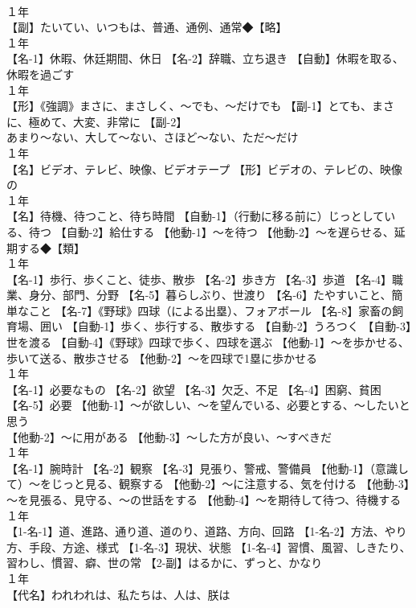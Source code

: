 \documentclass[8pt]{extreport}
\begin{document}
\begin{CJK}{UTF8}{min}
\\	１年	
\\	【副】たいてい、いつもは、普通、通例、通常◆【略】
\\	１年	
\\	【名-1】休暇、休廷期間、休日 【名-2】辞職、立ち退き 【自動】休暇を取る、休暇を過ごす
\\	１年	
\\	【形】《強調》まさに、まさしく、～でも、～だけでも 【副-1】とても、まさに、極めて、大変、非常に 【副-2】
\\	あまり～ない、大して～ない、さほど～ない、ただ～だけ
\\	１年	
\\	【名】ビデオ、テレビ、映像、ビデオテープ 【形】ビデオの、テレビの、映像の
\\	１年	
\\	【名】待機、待つこと、待ち時間 【自動-1】（行動に移る前に）じっとしている、待つ 【自動-2】給仕する 【他動-1】～を待つ 【他動-2】～を遅らせる、延期する◆【類】
\\	１年	
\\	【名-1】歩行、歩くこと、徒歩、散歩 【名-2】歩き方 【名-3】歩道 【名-4】職業、身分、部門、分野 【名-5】暮らしぶり、世渡り 【名-6】たやすいこと、簡単なこと 【名-7】《野球》四球（による出塁）、フォアボール 【名-8】家畜の飼育場、囲い 【自動-1】歩く、歩行する、散歩する 【自動-2】うろつく 【自動-3】世を渡る 【自動-4】《野球》四球で歩く、四球を選ぶ 【他動-1】～を歩かせる、歩いて送る、散歩させる 【他動-2】～を四球で1塁に歩かせる
\\	１年	
\\	【名-1】必要なもの 【名-2】欲望 【名-3】欠乏、不足 【名-4】困窮、貧困 【名-5】必要 【他動-1】～が欲しい、～を望んでいる、必要とする、～したいと思う
\\	【他動-2】～に用がある 【他動-3】～した方が良い、～すべきだ
\\	１年	
\\	【名-1】腕時計 【名-2】観察 【名-3】見張り、警戒、警備員 【他動-1】（意識して）～をじっと見る、観察する 【他動-2】～に注意する、気を付ける 【他動-3】～を見張る、見守る、～の世話をする 【他動-4】～を期待して待つ、待機する
\\	１年	
\\	【1-名-1】道、進路、通り道、道のり、道路、方向、回路 【1-名-2】方法、やり方、手段、方途、様式 【1-名-3】現状、状態 【1-名-4】習慣、風習、しきたり、習わし、慣習、癖、世の常 【2-副】はるかに、ずっと、かなり
\\	１年	
\\	【代名】われわれは、私たちは、人は、朕は

\end{CJK}
\end{document}
